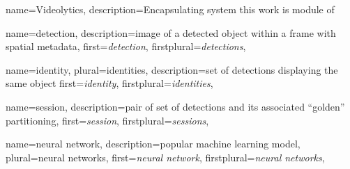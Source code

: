
{
    name=Videolytics,
    description={Encapsulating system this work is module of}
}

{
    name=detection,
    description={image of a detected object within a frame with spatial metadata},
    first=\emph{detection},
    firstplural=\emph{detections},
}

{
    name=identity,
    plural=identities,
    description={set of detections displaying the same object}
    first=\emph{identity},
    firstplural=\emph{identities},
}

{
    name=session,
    description={pair of set of detections and its associated ``golden'' partitioning},
    first=\emph{session},
    firstplural=\emph{sessions},
}


{
    name={neural network},
    description={popular machine learning model},
    plural={neural networks},
    first=\emph{neural network},
    firstplural=\emph{neural networks},
}